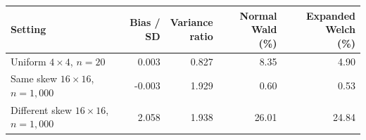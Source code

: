\begin{tabularx}{\textwidth}{@{}>{\raggedright\arraybackslash}Xrrrr@{}}
\toprule
\textbf{Setting} & \textbf{Bias / SD} & \shortstack[r]{\textbf{Variance}\\\textbf{ratio}} & \shortstack[r]{\textbf{Normal Wald}\\\textbf{(\%)}} & \shortstack[r]{\textbf{Expanded Welch}\\\textbf{(\%)}}\\
\midrule
Uniform \(4\times4\), \(n=20\) & 0.003 & 0.827 & 8.35 & 4.90\\
\addlinespace[0.35em]
Same skew \(16\times16\), \(n=1{,}000\) & -0.003 & 1.929 & 0.60 & 0.53\\
\addlinespace[0.35em]
Different skew \(16\times16\), \(n=1{,}000\) & 2.058 & 1.938 & 26.01 & 24.84\\
\bottomrule
\end{tabularx}
